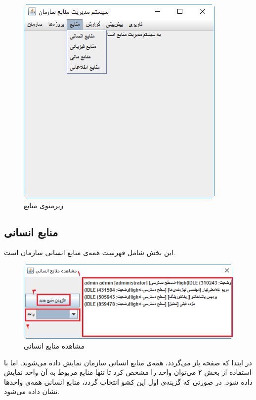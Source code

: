 	\begin{figure}[H]
		\centering
		\includegraphics[scale=0.7]{img/manual/resSubmenu}
		\caption{زیرمنوی منابع}
	\end{figure}

\subsection{منابع انسانی}
این بخش شامل فهرست همه‌ی منابع انسانی سازمان است.
	\begin{figure}[H]
		\centering
		\includegraphics[scale=0.5]{img/manual/hRess}
		\caption{مشاهده منابع انسانی}
		\label{f10}
	\end{figure}

در ابتدا که صفحه باز می‌گردد، همه‌ی منابع انسانی سازمان نمایش داده می‌شوند. اما با استفاده از بخش ۲ می‌توان واحد را مشخص کرد تا تنها منابع مربوط به آن واحد نمایش داده شود. در صورتی که گزینه‌ی اول این کشو انتخاب گردد، منابع انسانی همه‌ی واحدها نشان داده می‌شود.
